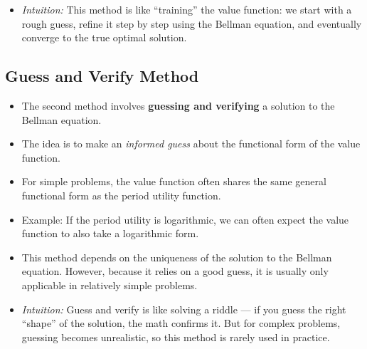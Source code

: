 \documentclass[12pt]{article}
\begin{document}
\begin{itemize}
    \item \textit{Intuition:} This method is like “training” the value function: we start with a rough guess, refine it step by step using the Bellman equation, and eventually converge to the true optimal solution.
\end{itemize}

\subsection*{\noindent\textbf{Guess and Verify Method}}

\begin{itemize}
    \item The second method involves \textbf{guessing and verifying} a solution to the Bellman equation.

    \item The idea is to make an \textit{informed guess} about the functional form of the value function.

    \item For simple problems, the value function often shares the same general functional form as the period utility function.

    \item Example: If the period utility is logarithmic, we can often expect the value function to also take a logarithmic form.

    \item This method depends on the uniqueness of the solution to the Bellman equation.  
    However, because it relies on a good guess, it is usually only applicable in relatively simple problems.

    \item \textit{Intuition:} Guess and verify is like solving a riddle — if you guess the right “shape” of the solution, the math confirms it. But for complex problems, guessing becomes unrealistic, so this method is rarely used in practice.
\end{itemize}
\end{document}
